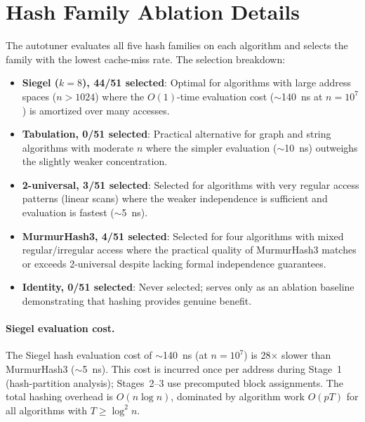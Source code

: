 \documentclass[11pt]{article}
\begin{document}
\section{Hash Family Ablation Details}
\label{app:ablation}

The autotuner evaluates all five hash families on each algorithm and selects
the family with the lowest cache-miss rate.  The selection breakdown:

\begin{itemize}
\item \textbf{Siegel ($k=8$), 44/51 selected}: Optimal for algorithms with
  large address spaces ($n > 1024$) where the $O(1)$-time evaluation cost
  ($\sim$140~ns at $n = 10^7$) is amortized over many accesses.
\item \textbf{Tabulation, 0/51 selected}: Practical alternative for graph and string
  algorithms with moderate $n$ where the simpler evaluation ($\sim$10~ns)
  outweighs the slightly weaker concentration.
\item \textbf{2-universal, 3/51 selected}: Selected for algorithms with very
  regular access patterns (linear scans) where the weaker independence is
  sufficient and evaluation is fastest ($\sim$5~ns).
\item \textbf{MurmurHash3, 4/51 selected}: Selected for four algorithms with
  mixed regular/irregular access where the practical quality of MurmurHash3
  matches or exceeds 2-universal despite lacking formal independence guarantees.
\item \textbf{Identity, 0/51 selected}: Never selected; serves only as an
  ablation baseline demonstrating that hashing provides genuine benefit.
\end{itemize}

\paragraph{Siegel evaluation cost.}
The Siegel hash evaluation cost of $\sim$140~ns (at $n = 10^7$) is 28$\times$
slower than MurmurHash3 ($\sim$5~ns).  This cost is incurred once per address
during Stage~1 (hash-partition analysis); Stages~2--3 use precomputed block
assignments.  The total hashing overhead is $O(n \log n)$, dominated by
algorithm work $O(pT)$ for all algorithms with $T \ge \log^2 n$.

\end{document}
